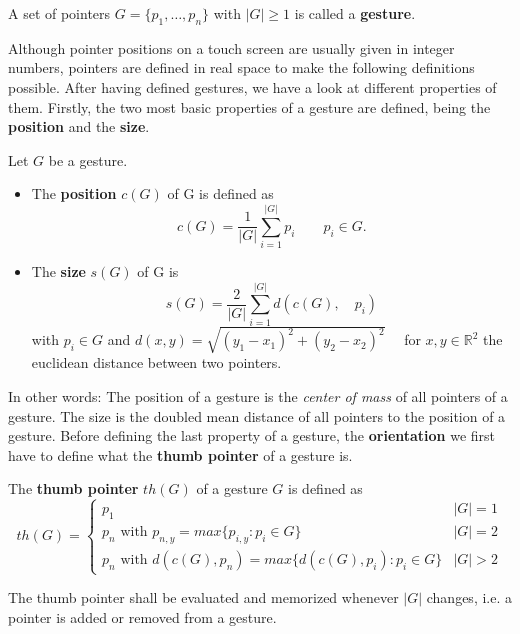 \begin{defn}
 A set of pointers $G = \{p_1,\dots , p_n\}$ with $|G| \geq 1$ is called a \textbf{gesture}.
\end{defn}

Although pointer positions on a touch screen are usually given in integer numbers, pointers are defined in real space to make the following definitions possible. After having defined gestures, we have a look at different properties of them. Firstly, the two most basic properties of a gesture are defined, being the \textbf{position} and the \textbf{size}.

\begin{defn}
	Let $G$ be a gesture.
	
\begin{itemize}
	\item The \textbf{position} $c(G)$ of G is defined as
	\begin{equation}
	c(G) = \frac{1}{|G|}\sum_{i=1}^{|G|}p_i \qquad  p_i \in G\text{.}
	\end{equation}
	
	\item The \textbf{size} $s(G)$ of G is
	\begin{equation}
	s(G) = \frac{2}{|G|}\sum_{i=1}^{|G|} d(c(G), \quad p_i)
	\end{equation}
	with $p_i \in G$ and $d(x, y) = \sqrt{(y_1 - x_1)^2 + (y_2 - x_2)^2}\quad$ for $x, y \in \mathbb{R}^2$ the euclidean distance between two pointers.
\end{itemize}
\end{defn}

In other words: The position of a gesture is the \textit{center of mass} of all pointers of a gesture. The size is the doubled mean distance of all pointers to the position of a gesture. Before defining the last property of a gesture, the \textbf{orientation} we first have to define what the \textbf{thumb pointer} of a gesture is.

\begin{defn}
	The \textbf{thumb pointer} $th(G)$ of a gesture $G$ is defined as
	\begin{equation}
	th(G) = \left\{
	\begin{array}{ll}
	p_1 & |G| = 1 \\
	p_n \text{ with } p_{n,y} = max\{p_{i,y} : p_i \in G\} & |G| = 2 \\
	p_n \text{ with } d(c(G), p_n) = max\{ d(c(G), p_i) : p_i \in G \}& |G| > 2
	\end{array}
	\right.
	\end{equation}
	
The thumb pointer shall be evaluated and memorized whenever $|G|$ changes, i.e. a pointer is added or removed from a gesture.
\end{defn}

